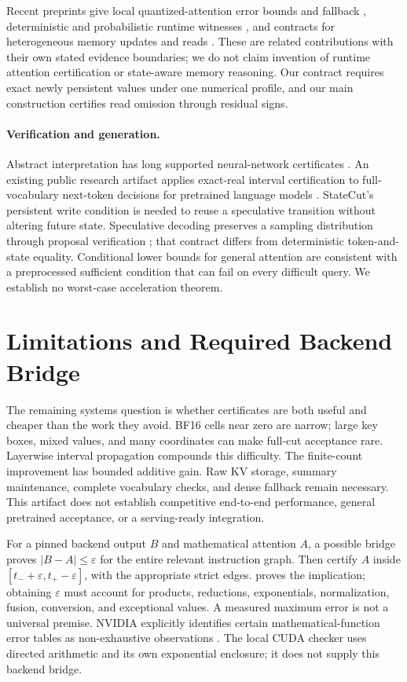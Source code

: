 \documentclass{article}
\theoremstyle{plain}
\theoremstyle{definition}
\theoremstyle{remark}
\begin{document}
Recent preprints give local quantized-attention error bounds and fallback
\citep{calver2026}, deterministic and probabilistic runtime witnesses
\citep{wei2026witcert}, and contracts for heterogeneous memory updates and
reads \citep{wei2026observability}. These are related contributions with
their own stated evidence boundaries; we do not claim invention of runtime
attention certification or state-aware memory reasoning. Our contract
requires exact newly persistent values under one numerical profile, and
our main construction certifies read omission through residual signs.

\paragraph{Verification and generation.}
Abstract interpretation has long supported neural-network certificates
\citep{singh2019deeppoly}. An existing public research artifact applies
exact-real interval certification to full-vocabulary next-token decisions
for pretrained language models \citep{naughton2026}. StateCut's persistent
write condition is needed to reuse a speculative transition without
altering future state. Speculative decoding preserves a sampling
distribution through proposal verification \citep{leviathan2023}; that
contract differs from deterministic token-and-state equality. Conditional
lower bounds for general attention \citep{dumankeles2023} are consistent
with a preprocessed sufficient condition that can fail on every difficult
query. We establish no worst-case acceleration theorem.

\section{Limitations and Required Backend Bridge}
\label{sec:limitations}

The remaining systems question is whether certificates are both useful
and cheaper than the work they avoid. BF16 cells near zero are narrow;
large key boxes, mixed values, and many coordinates can make full-cut
acceptance rare. Layerwise interval propagation compounds this difficulty.
The finite-count improvement has bounded additive gain. Raw KV storage,
summary maintenance, complete vocabulary checks, and dense fallback remain
necessary. This artifact does not establish competitive end-to-end
performance, general pretrained acceptance, or a serving-ready integration.

For a pinned backend output $B$ and mathematical attention $A$, a possible
bridge proves $|B-A|\le\varepsilon$ for the entire relevant instruction
graph. Then certify $A$ inside
$[t_-+\varepsilon,t_+-\varepsilon]$, with the appropriate strict
edges.  proves the implication; obtaining
$\varepsilon$ must account for products, reductions, exponentials,
normalization, fusion, conversion, and exceptional values. A measured
maximum error is not a universal premise. NVIDIA explicitly identifies
certain mathematical-function error tables as non-exhaustive observations
\citep{nvidiamath}. The local CUDA checker uses directed arithmetic and
its own exponential enclosure; it does not supply this backend bridge.
\end{document}
